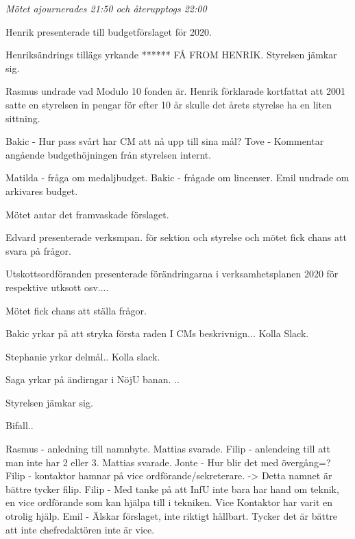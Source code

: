\documentclass[10pt]{article}
\begin{document}
\begin{paragrafer}
\begin{paragrafer}
      \textit{Mötet ajournerades 21:50 och återupptogs 22:00}

    \end{paragrafer}

    \begin{paragrafer}
      Henrik presenterade till budgetförslaget för 2020. 

      Henriksändrings tillägs yrkande ******  FÅ FROM HENRIK. 
      Styrelsen jämkar sig. 
      
      

      Rasmus undrade vad Modulo 10 fonden är. Henrik förklarade kortfattat att 2001 satte en styrelsen in pengar för efter 10 år skulle det årets styrelse ha en liten sittning. 

      Bakic - Hur pass svårt har CM att nå upp till sina mål?
      Tove - Kommentar angående budgethöjningen från styrelsen internt. 

      Matilda - fråga om medaljbudget.
      Bakic - frågade om lincenser. 
      Emil undrade om arkivares budget. 


      Mötet antar det framvaskade förslaget. 


      Edvard presenterade verksmpan. för sektion och styrelse och mötet fick chans att svara på frågor.

      Utskottsordföranden presenterade förändringarna i verksamhetsplanen 2020 för respektive utksott osv....

      Mötet fick chans att ställa frågor. 

      Bakic yrkar på att stryka första raden I CMs beskrivnign... Kolla Slack. 

      Stephanie yrkar delmål.. Kolla slack. 

      Saga yrkar på ändirngar i NöjU banan. .. 



      Styrelsen jämkar sig. 

      Bifall..



      Rasmus - anledning till namnbyte. Mattias svarade.
      Filip - anlendeing till att man inte har 2 eller 3.  Mattias svarade. 
      Jonte - Hur blir det med övergång=? 
      Filip - kontaktor hamnar på vice ordförande/sekreterare. -> Detta namnet är bättre tycker filip. 
      Filip - Med tanke på att InfU inte bara har hand om teknik, en vice ordförande som kan hjälpa till i tekniken. Vice Kontaktor har varit en otrolig hjälp. 
      Emil - Älskar förslaget, inte riktigt hållbart. Tycker det är bättre att inte chefredaktören inte är vice.
      

\end{paragrafer}
\end{paragrafer}
\end{document}
